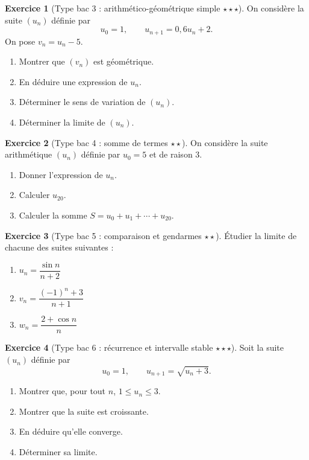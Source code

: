 \documentclass[11pt,a4paper]{article}
\theoremstyle{definition}
\newtheorem{exercice}{Exercice}[section]
\newcommand{\etoile}[1]{\hfill{\small\textbf{#1}}}
\begin{document}
\begin{exercice}[Type bac 3 : arithmético-géométrique simple \etoile{$\star\star\star$}]
On considère la suite $(u_n)$ définie par
\[
u_0=1,\qquad u_{n+1}=0{,}6u_n+2.
\]
On pose $v_n=u_n-5$.
\begin{enumerate}[label=\arabic*.]
    \item Montrer que $(v_n)$ est géométrique.
    \item En déduire une expression de $u_n$.
    \item Déterminer le sens de variation de $(u_n)$.
    \item Déterminer la limite de $(u_n)$.
\end{enumerate}
\end{exercice}

\begin{exercice}[Type bac 4 : somme de termes \etoile{$\star\star$}]
On considère la suite arithmétique $(u_n)$ définie par $u_0=5$ et de raison $3$.
\begin{enumerate}[label=\arabic*.]
    \item Donner l'expression de $u_n$.
    \item Calculer $u_{20}$.
    \item Calculer la somme $S= u_0+u_1+\cdots+u_{20}$.
\end{enumerate}
\end{exercice}

\begin{exercice}[Type bac 5 : comparaison et gendarmes \etoile{$\star\star$}]
Étudier la limite de chacune des suites suivantes :
\begin{enumerate}[label=\alph*)]
    \item $u_n=\dfrac{\sin n}{n+2}$
    \item $v_n=\dfrac{(-1)^n+3}{n+1}$
    \item $w_n=\dfrac{2+\cos n}{n}$
\end{enumerate}
\end{exercice}

\begin{exercice}[Type bac 6 : récurrence et intervalle stable \etoile{$\star\star\star$}]
Soit la suite $(u_n)$ définie par
\[
u_0=1,\qquad u_{n+1}=\sqrt{u_n+3}.
\]
\begin{enumerate}[label=\arabic*.]
    \item Montrer que, pour tout $n$, $1\le u_n\le 3$.
    \item Montrer que la suite est croissante.
    \item En déduire qu'elle converge.
    \item Déterminer sa limite.
\end{enumerate}
\end{exercice}
\end{document}
